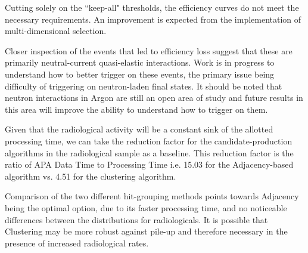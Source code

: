 \documentclass[10pt]{article}
\begin{document}
Cutting solely on the ``keep-all" thresholds, the efficiency curves do not meet the necessary requirements. An improvement is expected from the implementation of multi-dimensional selection.

Closer inspection of the events that led to efficiency loss suggest that these are primarily neutral-current quasi-elastic interactions. Work is in progress to understand how to better trigger on these events, the primary issue being difficulty of triggering on neutron-laden final states. It should be noted that neutron interactions in Argon are still an open area of study and future results in this area will improve the ability to understand how to trigger on them.

Given that the radiological activity will be a constant sink of the allotted processing time, we can take the reduction factor for the candidate-production algorithms in the radiological sample as a baseline. This reduction factor is the ratio of APA Data Time to Processing Time i.e. 15.03 for the Adjacency-based algorithm vs. 4.51 for the clustering algorithm.  

Comparison of the two different hit-grouping methods points towards Adjacency being the optimal option, due to its faster processing time, and no noticeable differences between the distributions for radiologicals. It is possible that Clustering may be more robust against pile-up and therefore necessary in the presence of increased radiological rates. 
\end{document}
